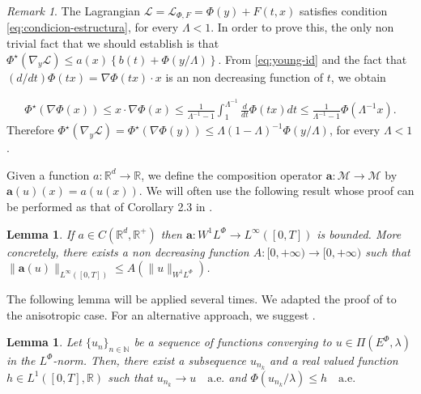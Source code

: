 \documentclass[twoside]{article}
\newtheorem{lem}[thm]{Lemma}
\theoremstyle{remark}
\newtheorem{comentario}{Remark}
\newcommand{\lphi}{L^{\Phi}}
\newcommand{\ephi}{E^{\Phi}}
\newcommand{\wphi}{W^{1}\lphi}
\renewcommand{\b}[1]{\boldsymbol{#1}}
\newcommand{\rr}{\mathbb{R}}
\renewcommand{\leq}{\leqslant}
\begin{document}
\begin{comentario}\label{com:lphi-satis S}
 The Lagrangian $\mathcal{L}=\mathcal{L}_{\Phi,F}=\Phi(y)+F(t,x)$ satisfies condition  \eqref{eq:condicion-estructura}, for every $\Lambda<1$. In order to prove this, the only non trivial fact that we should establish is that $ \Phi^{\star}(\nabla_{y}\mathcal{L})
\leq
a(x)\left\{b(t)+ \Phi\left({y}/{\Lambda}\right)\right\}$. From  \ref{eq:young-id} and the fact that $(d/dt)\Phi(tx)=\nabla\Phi(tx)\cdot x$ is an non decreasing function of $t$, we obtain  

\[
  \begin{split}
     \Phi^{\star}(\nabla \Phi (x))\leq  x\cdot \nabla\Phi(x) \leq\frac{1}{\Lambda^{-1}-1}\int_1^{\Lambda^{-1}} \frac{d}{dt}\Phi(tx)dt \leq\frac{1}{\Lambda^{-1}-1}\Phi(\Lambda^{-1} x). \end{split}
\]
Therefore  $\Phi^{\star}(\nabla_{y}\mathcal{L})=\Phi^{\star}\left(\nabla\Phi(y)\right)\leq \Lambda(1-\Lambda)^{-1} \Phi(y/\Lambda )$, for every $\Lambda<1$. 
\end{comentario}

Given a function $a:\mathbb{R}^d\to \mathbb{R}$, we define the composition operator $\b{a}:\mathcal{M}\to \mathcal{M}$ by $\b{a}(u)(x)= a(u(x))$.
We will often use the following result whose proof can be performed as that of  Corollary 2.3 in \cite{ABGMS2015}.


\begin{lem}\label{lem:cota-a}
\label{a_bound} If $a\in C(\mathbb{R}^d,\mathbb{R}^+)$ then $\b{a}:\wphi\to L^{\infty}([0,T])$ is bounded.
More concretely,  there exists a non decreasing function $A:[0,+\infty)\to[0,+\infty)$ such that
 $\|\b{a}(u)\|_{L^{\infty}([0,T])}\leq A(\|u\|_{\wphi})$.
\end{lem}

The following lemma will be applied several times. We adapted the proof of 
\cite[Lemma 2.5]{ABGMS2015} to the anisotropic case.    For an alternative approach, we  suggest \cite{chamra2017anisotropic}.  







\begin{lem}\label{segundo lema}
Let  $\{{u}_n\}_{n\in \mathbb{N}}$ be a sequence of  functions  converging to  ${u}\in \Pi(\ephi,\lambda)$  in the $\lphi$-norm. Then, there exist a subsequence
${u}_{n_k}$ and a real valued function $h\in L^1([0,T],\rr)$ such that ${u}_{n_k}\rightarrow {u} \quad\text{a.e.}$ and $\Phi({u}_{n_k}/\lambda)\leq h\quad\text{a.e.}$
\end{lem}
\end{document}
